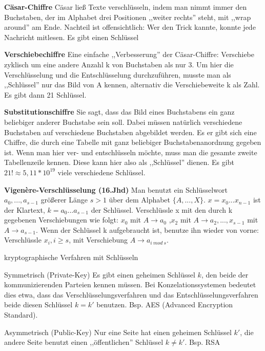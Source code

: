 \documentclass[a4paper]{article}
\renewcommand{\note}[2]{\begin{noteBox} \textbf{#1} #2 \end{noteBox}}
\begin{document}
\begin{multicols}{3}
    \note{Cäsar-Chiffre}{
        Cäsar ließ Texte verschlüsseln, indem man nimmt immer den Buchstaben, der im Alphabet drei Positionen ,,weiter rechts'' steht, mit ,,wrap around'' am Ende. Nachteil ist offensichtlich: Wer den Trick kannte, konnte jede Nachricht mitlesen. Es gibt einen Schlüssel
    }

    \note{Verschiebechiffre}{
        Eine einfache ,,Verbesserung'' der Cäsar-Chiffre: Verschiebe zyklisch um eine andere Anzahl k von Buchstaben als nur 3. Um hier die Verschlüsselung und die Entschlüsselung durchzuführen, musste man als ,,Schlüssel''  nur das Bild von A kennen, alternativ die Verschiebeweite k als Zahl. Es gibt dann 21 Schlüssel.
    }

    \note{Substitutionschiffre}{
        Sie sagt, dass das Bild eines Buchstabens ein ganz beliebiger anderer Buchstabe sein soll. Dabei müssen natürlich verschiedene Buchstaben auf verschiedene Buchstaben abgebildet werden. Es er gibt sich eine Chiffre, die durch eine Tabelle mit ganz beliebiger Buchstabenanordnung gegeben ist.
        Wenn man hier ver- und entschlüsseln möchte, muss man die gesamte zweite Tabellenzeile kennen. Diese kann hier also als ,,Schlüssel''  dienen. Es gibt $21!\approx 5,11* 10^{19}$ viele verschiedene Schlüssel.
    }

    \note{Vigenère-Verschlüsselung (16.Jhd)}{
    Man benutzt ein Schlüsselwort $a_0,...,a_{s-1}$ größerer Länge $s > 1$ über dem Alphabet $\{A,...,X\}$. $x=x_0...x_{n-1}$ ist der Klartext, $k=a_0 ...a_{s-1}$ der Schlüssel. Verschlüssle x mit den durch k gegebenen Verschiebungen wie folgt: $x_0$ mit $A \rightarrow a_0$ ,$x_2$ mit $A \rightarrow a_2,... ,x_{s-1}$ mit $A\rightarrow a_{s-1}$.  Wenn der Schlüssel k aufgebraucht ist, benutze ihn wieder von vorne: Verschlüssle $x_i,i\geq s$, mit Verschiebung $A \rightarrow a_{i\ mod\ s}$.
    }

    kryptographische Verfahren mit Schlüsseln
    \begin{description*}
        \item[Symmetrisch (Private-Key)] Es gibt einen geheimen Schlüssel $k$, den beide der kommunizierenden Parteien kennen müssen. Bei Konzelationssystemen bedeutet dies etwa, dass das Verschlüsselungsverfahren und das Entschlüsselungsverfahren beide diesen Schlüssel $k=k'$ benutzen. Bsp. AES (Advanced Encryption Standard).
        \item[Asymmetrisch (Public-Key)] Nur eine Seite hat einen geheimen Schlüssel $k'$, die andere Seite benutzt einen ,,öffentlichen'' Schlüssel $k\not =k'$. Bsp. RSA
    \end{description*}


\end{multicols}
\end{document}
